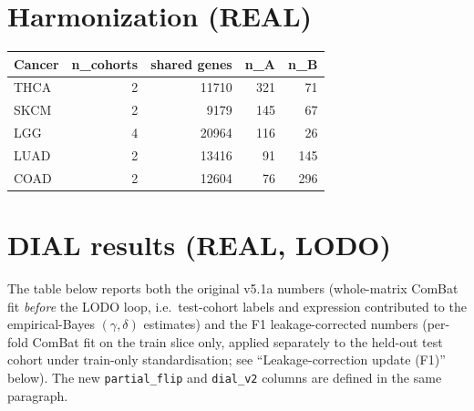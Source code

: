 \documentclass[11pt,a4paper]{article}
\begin{document}
\section{Harmonization (REAL)}
\begin{tabular}{lrrrr}\toprule
Cancer & n\_cohorts & shared genes & n\_A & n\_B \\ \midrule
THCA & 2 & 11710 & 321 & 71 \\
SKCM & 2 & 9179 & 145 & 67 \\
LGG & 4 & 20964 & 116 & 26 \\
LUAD & 2 & 13416 & 91 & 145 \\
COAD & 2 & 12604 & 76 & 296 \\
\bottomrule\end{tabular}
\section{DIAL results (REAL, LODO)}
The table below reports both the original v5.1a numbers (whole-matrix
ComBat fit \emph{before} the LODO loop, i.e.\ test-cohort labels and
expression contributed to the empirical-Bayes $(\gamma, \delta)$
estimates) and the F1 leakage-corrected numbers (per-fold ComBat fit on
the train slice only, applied separately to the held-out test cohort
under train-only standardisation; see ``Leakage-correction update (F1)''
below). The new \texttt{partial\_flip} and \texttt{dial\_v2} columns are
defined in the same paragraph.
\end{document}
